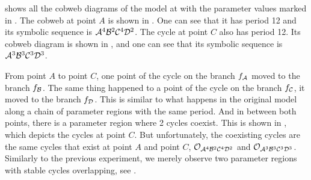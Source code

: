 shows all the cobweb diagrams of the model at with the parameter values marked in .
The cobweb at point $A$ is shown in .
One can see that it has period 12 and its symbolic sequence is $\mathcal{A}^4\mathcal{B}^2\mathcal{C}^4\mathcal{D}^2$.
The cycle at point $C$ also has period 12.
Its cobweb diagram is shown in , and one can see that its symbolic sequence is $\mathcal{A}^3\mathcal{B}^3\mathcal{C}^3\mathcal{D}^3$.

From point $A$ to point $C$, one point of the cycle on the branch $f_{\mathcal{A}}$ moved to the branch $f_{\mathcal{B}}$.
The same thing happened to a point of the cycle on the branch $f_{\mathcal{C}}$, it moved to the branch $f_{\mathcal{D}}$.
This is similar to what happens in the original model along a chain of parameter regions with the same period.
And in between both points, there is a parameter region where 2 cycles coexist.
This is shown in , which depicts the cycles at point $C$.
But unfortunately, the coexisting cycles are the same cycles that exist at point $A$ and point $C$, $\mathcal{O}_{\mathcal{A}^4\mathcal{B}^2\mathcal{C}^4\mathcal{D}^2}$ and $\mathcal{O}_{\mathcal{A}^3\mathcal{B}^3\mathcal{C}^3\mathcal{D}^3}$.
Similarly to the previous experiment, we merely observe two parameter regions with stable cycles overlapping, see .
